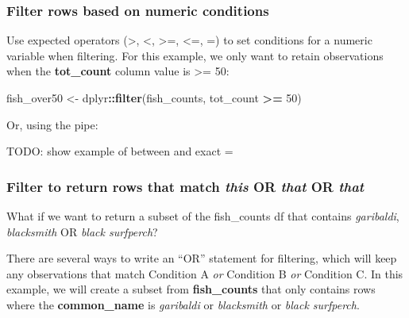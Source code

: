 \documentclass[]{book}
\newenvironment{Shaded}{\begin{snugshade}}{\end{snugshade}}
\newcommand{\DecValTok}[1]{\textcolor[rgb]{0.00,0.00,0.81}{#1}}
\newcommand{\KeywordTok}[1]{\textcolor[rgb]{0.13,0.29,0.53}{\textbf{#1}}}
\newcommand{\NormalTok}[1]{#1}
\newcommand{\OperatorTok}[1]{\textcolor[rgb]{0.81,0.36,0.00}{\textbf{#1}}}
\newcommand{\StringTok}[1]{\textcolor[rgb]{0.31,0.60,0.02}{#1}}
\begin{document}
\hypertarget{filter-rows-based-on-numeric-conditions}{%
\subsubsection{Filter rows based on numeric conditions}\label{filter-rows-based-on-numeric-conditions}}

Use expected operators (\textgreater{}, \textless{}, \textgreater{}=, \textless{}=, =) to set conditions for a numeric variable when filtering. For this example, we only want to retain observations when the \textbf{tot\_count} column value is \textgreater{}= 50:

\begin{Shaded}
\begin{Highlighting}[]
\NormalTok{fish_over50 <-}\StringTok{ }\NormalTok{dplyr}\OperatorTok{::}\KeywordTok{filter}\NormalTok{(fish_counts, tot_count }\OperatorTok{>=}\StringTok{ }\DecValTok{50}\NormalTok{)}
\end{Highlighting}
\end{Shaded}

Or, using the pipe:

\begin{Shaded}
\end{Shaded}

TODO: show example of between and exact =

\hypertarget{filter-to-return-rows-that-match-this-or-that-or-that}{%
\subsubsection{\texorpdfstring{Filter to return rows that match \emph{this} OR \emph{that} OR \emph{that}}{Filter to return rows that match this OR that OR that}}\label{filter-to-return-rows-that-match-this-or-that-or-that}}

What if we want to return a subset of the fish\_counts df that contains \emph{garibaldi}, \emph{blacksmith} OR \emph{black surfperch}?

There are several ways to write an ``OR'' statement for filtering, which will keep any observations that match Condition A \emph{or} Condition B \emph{or} Condition C. In this example, we will create a subset from \textbf{fish\_counts} that only contains rows where the \textbf{common\_name} is \emph{garibaldi} or \emph{blacksmith} or \emph{black surfperch}.
\end{document}

